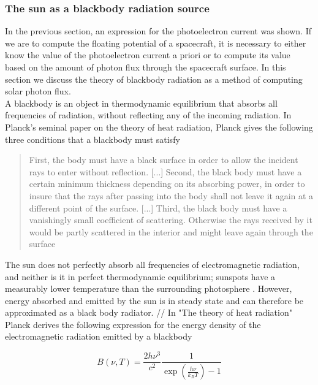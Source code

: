 \subsubsection*{The sun as a blackbody radiation source}
In the previous section, an expression for the photoelectron current was shown. If we are to compute the floating potential of a spacecraft, it is necessary to either know the value of the photoelectron current a priori or to compute its value based on the amount of photon flux through the spacecraft surface. In this section we discuss the theory of blackbody radiation as a method of computing solar photon flux.
\\
A blackbody is an object in thermodynamic equilibrium that absorbs all frequencies of radiation, without reflecting any of the incoming radiation. In Planck's seminal paper on the theory of heat radiation, Planck gives the following three conditions that a blackbody must satisfy 

\begin{quote}
    First, the body must have a black surface in order to allow the incident rays to enter without reflection. [...] Second, the black body must have a certain minimum thickness depending on its absorbing power, in order to insure that the rays after passing into the body shall not leave it again at a different point of the surface. [...] Third, the black body must have a vanishingly small coefficient of scattering. Otherwise the rays received by it would be partly scattered in the interior and might leave again through the surface
\end{quote}

The sun does not perfectly absorb all frequencies of electromagnetic radiation, and neither is it in perfect thermodynamic equilibrium; sunspots have a measurably lower temperature than the surrounding photosphere . However, energy absorbed and emitted by the sun is in steady state and can therefore be approximated as a black body radiator. 
//
In "The theory of heat radiation" Planck derives the following expression for the energy density of the electromagnetic radiation emitted by a blackbody  

\begin{equation}\label{eq:planckFreq}
    B(\nu, T) = \frac{2 h \nu^3}{c^2} \frac{1}{\exp(\frac{h \nu}{k_B T}) - 1}
\end{equation}

